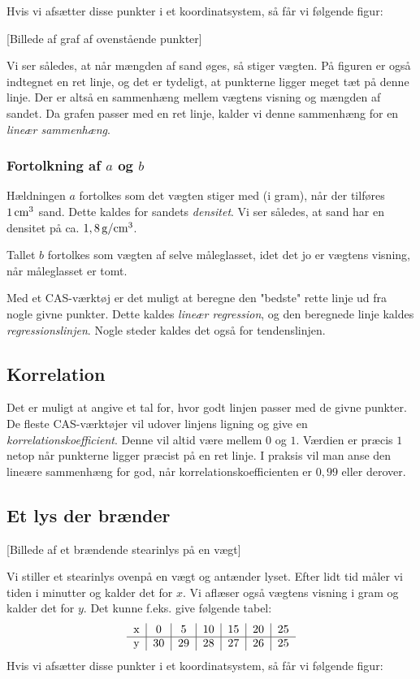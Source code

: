 \documentclass[12pt,oneside,a4paper]{article}
\begin{document}
Hvis vi afsætter disse punkter i et koordinatsystem, så får vi følgende figur:

[Billede af graf af ovenstående punkter]

Vi ser således, at når mængden af sand øges, så stiger vægten. 
På figuren er også indtegnet en ret linje, og det er tydeligt, at punkterne
ligger meget tæt på denne linje.  Der er altså en sammenhæng mellem vægtens
visning og mængden af sandet. Da grafen passer med en ret linje, kalder vi
denne sammenhæng for en {\em lineær sammenhæng}.

\subsubsection{Fortolkning af $a$ og $b$}
Hældningen $a$ fortolkes som det vægten stiger med (i gram), når der tilføres 
$1\, {\rm cm}^3$ sand. Dette kaldes for sandets {\em densitet}. Vi ser således, 
at sand har en densitet på ca. $1,8\, {\rm g}/{\rm cm}^3$.

Tallet $b$ fortolkes som vægten af selve måleglasset, idet det jo er vægtens
visning, når måleglasset er tomt.

Med et CAS-værktøj er det muligt at beregne den "bedste" rette linje ud fra
nogle givne punkter. Dette kaldes {\em lineær regression}, og den beregnede
linje kaldes {\em regressionslinjen}. Nogle steder kaldes det også for
tendenslinjen.

\subsection{Korrelation}
Det er muligt at angive et tal for, hvor godt linjen passer med de givne
punkter.  De fleste CAS-værktøjer vil udover linjens ligning og give en {\em
korrelationskoefficient}.  Denne vil altid være mellem $0$ og $1$. Værdien er
præcis $1$ netop når punkterne ligger præcist på en ret linje.  I praksis vil
man anse den lineære sammenhæng for god, når korrelationskoefficienten er
$0,99$ eller derover.


\subsection{Et lys der brænder}
[Billede af et brændende stearinlys på en vægt]

Vi stiller et stearinlys ovenpå en vægt og antænder lyset. Efter lidt tid måler
vi tiden i minutter og kalder det for $x$. Vi aflæser også vægtens visning i
gram og kalder det for $y$. Det kunne f.eks. give følgende tabel:
$$
\begin{tabular}{c|c|c|c|c|c|c}
    x &  0 &  5 & 10 & 15 & 20 & 25 \\
    \hline
    y & 30 & 29 & 28 & 27 & 26 & 25
\end{tabular}
$$
Hvis vi afsætter disse punkter i et koordinatsystem, så får vi følgende figur:
\end{document}
